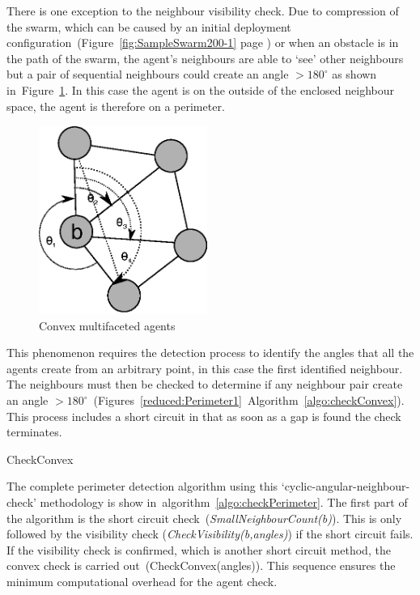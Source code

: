 There is one exception to the neighbour visibility check. Due to compression of the swarm, which can be caused by an initial deployment configuration~(Figure~\ref{fig:SampleSwarm200-1} page \pageref{fig:SampleSwarm200-1}) or when an obstacle is in the path of the swarm, the agent's neighbours are able to `see' other neighbours but a pair of sequential neighbours could create an angle $> 180^\circ$ as shown in~Figure~\ref{reduced:Perimeter2}. In this case the agent is on the outside of the enclosed neighbour space, the agent is therefore on a perimeter. 

\begin{figure}[H]
\begin{center}
\includegraphics[width=5.5cm]{CHAPTER-6/figures/Perimeter2}
\end{center}
\caption{Convex multifaceted agents \label{reduced:Perimeter2}}
\end{figure}

This phenomenon requires the detection process to identify the angles that all the agents create from an arbitrary point, in this case the first identified neighbour. The neighbours must then be checked to determine if any neighbour pair create an angle $> 180^\circ$~(Figures~\ref{reduced:Perimeter1}~Algorithm~\ref{algo:checkConvex}). This process includes a short circuit in that as soon as a gap is found the check terminates. 

\begin{algorithm}[H]
\DontPrintSemicolon
\SetAlgoLined
\caption{CheckConvex}
\label{algo:checkConvex}
\end{algorithm}

The complete perimeter detection algorithm using this `cyclic-angular-neighbour-check' methodology is show in~algorithm~\ref{algo:checkPerimeter}. The first part of the algorithm is the short circuit check~(\textit{SmallNeighbourCount(b)}). This is only followed by the visibility check (\textit{CheckVisibility(b,angles)}) if the short circuit fails. If the visibility check is confirmed, which is another short circuit method, the convex check is carried out~(CheckConvex(angles)). This sequence ensures the minimum computational overhead for the agent check. 

